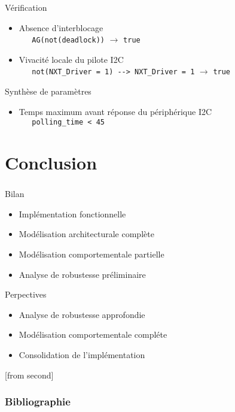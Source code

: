 \documentclass{beamer}
\begin{document}
      \begin{frame}
        \frametitle{\secname}
        \framesubtitle{\subsecname}
        
        \begin{block}{Vérification}
          \begin{itemize}
            \item Absence d'interblocage \\
              \small {\tt ~~ AG(not(deadlock))} $\rightarrow$ {\tt true}
            \item Vivacité locale du pilote I2C\\
              \small {\tt ~~ not(NXT\_Driver = 1) -{}-> NXT\_Driver = 1}
              $\rightarrow$ {\tt true} 
          \end{itemize}
        \end{block}

        \begin{block}{Synthèse de paramètres}
          \begin{itemize}
            \item Temps maximum avant réponse du périphérique I2C \\
              \small {\tt ~~ polling\_time < 45}
          \end{itemize}
        \end{block}
      \end{frame}
        
  \section{Conclusion}
    \begin{frame}
      \frametitle{\secname}

      \begin{block}{Bilan}
        \begin{itemize}     
          \item Implémentation fonctionnelle
          \item Modélisation architecturale complète
          \item Modélisation comportementale partielle
          \item Analyse de robustesse préliminaire 
        \end{itemize}
      \end{block}

      \pause
      \begin{block}{Perpectives}
        \begin{itemize}
          \item Analyse de robustesse approfondie
          \item Modélisation comportementale compléte
          \item Consolidation de l'implémentation
        \end{itemize}
      \end{block}
    \end{frame}

  [from second] 
  \begin{frame}[allowframebreaks]
    \frametitle{Bibliographie}

    \scriptsize
    
    
  \end{frame}
\end{document}
